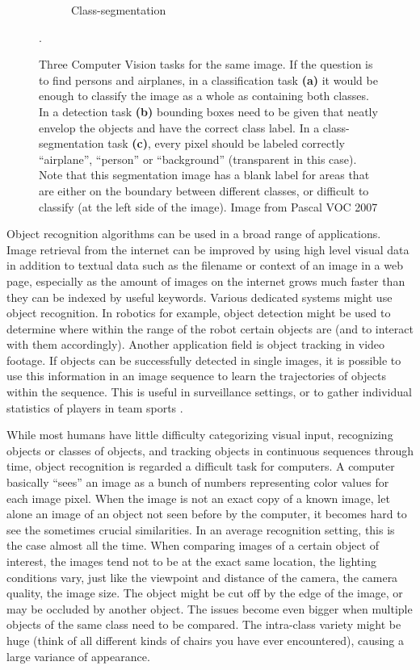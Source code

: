 \begin{figure}[hbt]
\begin{subfigure}[b]{0.3\textwidth}
            \caption{Class-segmentation}
            \label{fig:segmentation}
            \end{subfigure}
    \caption{Three Computer Vision tasks for the same image. If the question is to find persons and airplanes, in a classification task \textbf{(a)} it would be enough to classify the image as a whole as containing both classes. In a detection task \textbf{(b)} bounding boxes need to be given that neatly envelop the objects and have the correct class label. In a class-segmentation task \textbf{(c)}, every pixel should be labeled correctly ``airplane'', ``person'' or ``background'' (transparent in this case). Note that this segmentation image has a blank label for areas that are either on the boundary between different classes, or difficult to classify (at the left side of the image). Image from Pascal VOC 2007 \cite{pascal-voc-2007}}.
    \label{fig:clsdetseg}
\end{figure}

Object recognition algorithms can be used in a broad range of applications. Image retrieval from the internet can be improved by using high level visual data in addition to textual data such as the filename or context of an image in a web page, especially as the amount of images on the internet grows much faster than they can be indexed by useful keywords. Various dedicated systems might use object recognition. In robotics for example, object detection might be used to determine where within the range of the robot certain objects are (and to interact with them accordingly). Another application field is object tracking in video footage. If objects can be successfully detected in single images, it is possible to use this information in an image sequence to learn the trajectories of objects within the sequence. This is useful in surveillance settings, or to gather individual statistics of players in team sports \cite{benfold2011stable, ekin2003automatic, lipton1998moving}.

While most humans have little difficulty categorizing visual input, recognizing objects or classes of objects, and tracking objects in continuous sequences through time, object recognition is regarded a difficult task for computers. A computer basically ``sees'' an image as a bunch of numbers representing color values for each image pixel. When the image is not an exact copy of a known image, let alone an image of an object not seen before by the computer, it becomes hard to see the sometimes crucial similarities. In an average recognition setting, this is the case almost all the time. When comparing images of a certain object of interest, the images tend not to be at the exact same location, the lighting conditions vary, just like the viewpoint and distance of the camera, the camera quality, the image size. The object might be cut off by the edge of the image, or may be occluded by another object. The issues become even bigger when multiple objects of the same class need to be compared. The intra-class variety might be huge (think of all different kinds of chairs you have ever encountered), causing a large variance of appearance.

